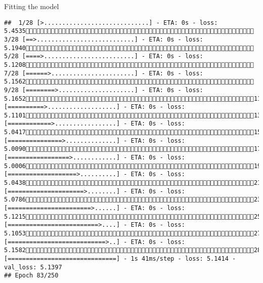 \documentclass[
  ignorenonframetext,
]{beamer}
\begin{document}
\begin{frame}[fragile]{Fitting the model}
\begin{verbatim}
##  1/28 [>.............................] - ETA: 0s - loss: 5.4535 3/28 [==>...........................] - ETA: 0s - loss: 5.1940 5/28 [====>.........................] - ETA: 0s - loss: 5.1208 7/28 [======>.......................] - ETA: 0s - loss: 5.1562 9/28 [========>.....................] - ETA: 0s - loss: 5.165211/28 [==========>...................] - ETA: 0s - loss: 5.110113/28 [============>.................] - ETA: 0s - loss: 5.041715/28 [===============>..............] - ETA: 0s - loss: 5.009017/28 [=================>............] - ETA: 0s - loss: 5.000619/28 [===================>..........] - ETA: 0s - loss: 5.043821/28 [=====================>........] - ETA: 0s - loss: 5.078623/28 [=======================>......] - ETA: 0s - loss: 5.121525/28 [=========================>....] - ETA: 0s - loss: 5.105327/28 [===========================>..] - ETA: 0s - loss: 5.158228/28 [==============================] - 1s 41ms/step - loss: 5.1414 - val_loss: 5.1397
## Epoch 83/250

\end{verbatim}
\end{frame}
\end{document}
